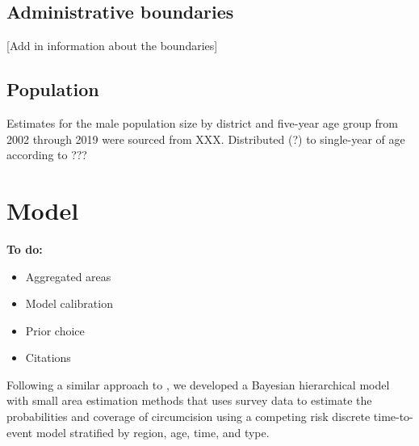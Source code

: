\documentclass{article}
\begin{document}
\begin{appendix}
\subsection{Administrative boundaries}
\label{sec:org0995c95}


[Add in information about the boundaries] 


\subsection{Population}
\label{sec:org0d7d6e9}


Estimates for the male population size by district and five-year age group from 2002 through 2019 were sourced from XXX. 
Distributed (?) to single-year of age according to ??? 


\section{Model}
\label{sec:org38d457a}


{\color{red} \bf
To do:
\begin{itemize}
    \item Aggregated areas
    \item Model calibration
    \item Prior choice
    \item Citations
\end{itemize}}

Following a similar approach to \cite{thomas2021multilevel}, we developed a Bayesian hierarchical model with small area estimation methods that uses survey data to estimate the probabilities and coverage of circumcision using a competing risk discrete time-to-event model stratified by region, age, time, and type.


\end{appendix}
\end{document}
